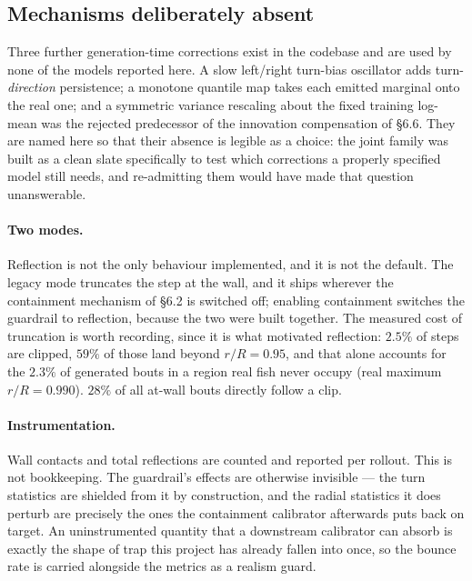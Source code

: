 \subsection{Mechanisms deliberately absent}

Three further generation-time corrections exist in the codebase and are used by none of the models
reported here. A slow left/right turn-bias oscillator adds turn-\emph{direction} persistence; a
monotone quantile map takes each emitted marginal onto the real one; and a symmetric variance
rescaling about the fixed training log-mean was the rejected predecessor of the innovation
compensation of \S6.6. They are named here so that their absence is legible as a choice: the joint
family was built as a clean slate specifically to test which corrections a properly specified model
still needs, and re-admitting them would have made that question unanswerable.




\paragraph{Two modes.} Reflection is not the only behaviour implemented, and it is not the default.
The legacy mode truncates the step at the wall, and it ships wherever the containment mechanism of
\S6.2 is switched off; enabling containment switches the guardrail to reflection, because the two
were built together. The measured cost of truncation is worth recording, since it is what motivated
reflection: $2.5\%$ of steps are clipped, $59\%$ of those land beyond $r/R=0.95$, and that alone
accounts for the $2.3\%$ of generated bouts in a region real fish never occupy (real maximum
$r/R=0.990$). $28\%$ of all at-wall bouts directly follow a clip.

\paragraph{Instrumentation.} Wall contacts and total reflections are counted and reported per
rollout. This is not bookkeeping. The guardrail's effects are otherwise invisible --- the turn
statistics are shielded from it by construction, and the radial statistics it does perturb are
precisely the ones the containment calibrator afterwards puts back on target. An uninstrumented
quantity that a downstream calibrator can absorb is exactly the shape of trap this project has
already fallen into once, so the bounce rate is carried alongside the metrics as a realism guard.

